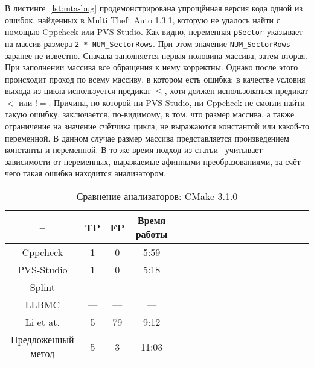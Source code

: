 В листинге~\ref{lst:mta-bug} продемонстрирована упрощённая версия кода
одной из ошибок, найденных в Multi Theft Auto 1.3.1, которую не
удалось найти с помощью Cppcheck или PVS-Studio. Как видно, переменная
\texttt{pSector} указывает на массив размера \texttt{2 *
  NUM\_SectorRows}. При этом значение \texttt{NUM\_SectorRows} заранее
не известно. Сначала заполняется первая половина массива, затем
вторая. При заполнении массива все обращения к нему корректны. Однако
после этого происходит проход по всему массиву, в котором есть ошибка:
в качестве условия выхода из цикла используется предикат $\leq$, хотя
должен использоваться предикат $<$ или $!=$. Причина, по которой ни
PVS-Studio, ни Cppcheck не смогли найти такую ошибку, заключается,
по-видимому, в том, что размер массива, а также ограничение на
значение счётчика цикла, не выражаются константой или какой-то
переменной. В данном случае размер массива представляется
произведением константы и переменной. В то же время подход из
статьи~\cite{li2010practical} учитывает зависимости от переменных,
выражаемые афинными преобразованиями, за счёт чего такая ошибка
находится анализатором.

\begin{table}[!h]
\caption{Сравнение анализаторов: CMake 3.1.0}\label{tab:comparison-cmake}
\centering
  \begin{tabular}{|*{18}{c|}}\hline
  --                 & TP  & FP  & Время работы \\\hline
  Cppcheck           & 1   & 0   & 5:59         \\\hline
  PVS-Studio         & 1   & 0   & 5:18         \\\hline
  Splint             & --- & --- & ---          \\\hline
  LLBMC              & --- & --- & ---          \\\hline
  Li et at.          & 5   & 79  & 9:12         \\\hline
  Предложенный метод & 5   & 3   & 11:03        \\\hline
  \end{tabular}
\end{table}

